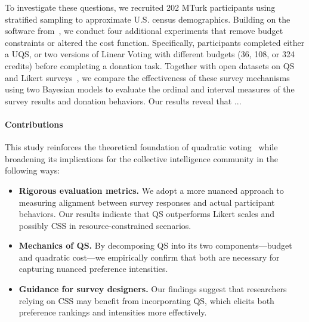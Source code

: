 
To investigate these questions, we recruited 202 MTurk participants using stratified sampling to approximate U.S. census demographics. Building on the software from~\citet{chengCanShowWhat2021}, we conduct four additional experiments that remove budget constraints or altered the cost function. Specifically, participants completed either a UQS, or two versions of Linear Voting with different budgets (36, 108, or 324 credits) before completing a donation task. Together with open datasets on QS and Likert surveys~\cite{illinoisdatabankIDB-1928463}, we compare the effectiveness of these survey mechanisms using two Bayesian models to evaluate the ordinal and interval measures of the survey results and donation behaviors. Our results reveal that ...


\paragraph{Contributions}
This study reinforces the theoretical foundation of quadratic voting~\cite{lalley2016quadratic} while broadening its implications for the collective intelligence community in the following ways:
\begin{itemize}
    \item \textbf{Rigorous evaluation metrics.} We adopt a more nuanced approach to measuring alignment between survey responses and actual participant behaviors. Our results indicate that QS outperforms Likert scales and possibly CSS in resource-constrained scenarios.
    \item \textbf{Mechanics of QS.} By decomposing QS into its two components---budget and quadratic cost---we empirically confirm that both are necessary for capturing nuanced preference intensities.
    \item \textbf{Guidance for survey designers.} Our findings suggest that researchers relying on CSS may benefit from incorporating QS, which elicits both preference rankings and intensities more effectively.
\end{itemize}



